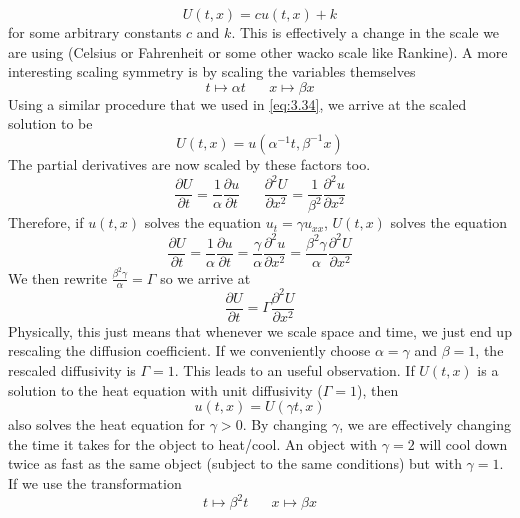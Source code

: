 \documentclass{article}
\newcommand{\pd}[2]{\frac{\partial #1}{\partial #2}}
\newcommand{\pdt}[2]{\frac{\partial ^2 #1}{\partial #2 ^2}}
\numberwithin{equation}{section}
\begin{document}
\begin{equation}
    U(t,x) = cu(t,x)+k
\end{equation}
for some arbitrary constants $c$ and $k$. This is effectively a change in the scale we are using (Celsius or Fahrenheit or some other wacko scale like Rankine). A more interesting scaling symmetry is by scaling the variables themselves
\begin{equation}
    t \mapsto \alpha t \hspace{20pt} x\mapsto \beta x
\end{equation}
Using a similar procedure that we used in \eqref{eq:3.34}, we arrive at the scaled solution to be 
\begin{equation}
    U(t,x) = u(\alpha^{-1}t, \beta^{-1}x)
\end{equation}
The partial derivatives are now scaled by these factors too. 
\begin{equation*}
    \pd{U}{t} = \frac{1}{\alpha} \pd{u}{t} \hspace{20pt} \pdt{U}{x} = \frac{1}{\beta^2}\pdt{u}{x}
\end{equation*}
Therefore, if $u(t,x)$ solves the equation $u_t = \gamma u_{xx}$, $U(t,x)$ solves the equation 
\begin{equation}
    \pd{U}{t} = \frac{1}{\alpha} \pd{u}{t} = \frac{\gamma}{\alpha}\pdt{u}{x} = \frac{\beta^2 \gamma}{\alpha}\pdt{U}{x}
\end{equation}
We then rewrite $\frac{\beta^2 \gamma}{\alpha} =\Gamma$ so we arrive at 
\begin{equation*}
    \pd{U}{t} = \Gamma \pdt{U}{x}
\end{equation*}
Physically, this just means that whenever we scale space and time, we just end up rescaling the diffusion coefficient. If we conveniently choose $\alpha =\gamma$ and $\beta =1$, the rescaled diffusivity is $\Gamma =1$. This leads to an useful observation. If $U(t,x)$ is a solution to the heat equation with unit diffusivity ($\Gamma =1$), then 
\begin{equation*}
    u(t,x) = U(\gamma t,x)
\end{equation*}
also solves the heat equation for $\gamma > 0$. By changing $\gamma$, we are effectively changing the time it takes for the object to heat/cool. An object with $\gamma=2$ will cool down twice as fast as the same object (subject to the same conditions) but with $\gamma =1$. If we use the transformation 
\begin{equation*}
    t\mapsto \beta^2t \hspace{20pt} x\mapsto \beta x
\end{equation*}
\end{document}
